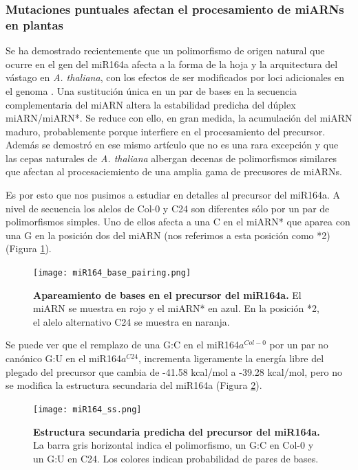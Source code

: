 \subsubsection{Mutaciones puntuales afectan el procesamiento de miARNs en plantas}

Se ha demostrado recientemente que un polimorfismo de origen natural que ocurre en el gen del miR164a afecta a la forma de la hoja y la arquitectura del vástago en \textit{A. thaliana}, con los efectos de ser modificados por loci adicionales en el genoma \citep{pmid22206705}.
Una sustitución única en un par de bases en la secuencia complementaria del miARN altera la estabilidad predicha del dúplex miARN/miARN*.
Se reduce con ello, en gran medida, la acumulación del miARN maduro, probablemente porque interfiere en el procesamiento del precursor.
Además se demostró en ese mismo artículo que no es una rara excepción y que las cepas naturales de \textit{A. thaliana} albergan decenas de polimorfismos similares que afectan al procesaciemiento de una amplia gama de precusores de miARNs.

Es por esto que nos pusimos a estudiar en detalles al precursor del miR164a.
A nivel de secuencia los alelos de Col-0 y C24 son diferentes sólo por un par de polimorfismos simples.
Uno de ellos afecta a una C en el miARN* que aparea con una G en la posición dos del miARN (nos referimos a esta posición como *2) (Figura \ref{fig:miR164_base_pairing}).

\begin{figure}[htbp!] 
	\centering    
	\texttt{[image: miR164\_base\_pairing.png]}
	\caption[Apareamiento de bases en el precursor del miR164a]{
		\textbf{Apareamiento de bases en el precursor del miR164a.}
		El miARN se muestra en rojo y el miARN* en azul.
		En la posición *2, el alelo alternativo C24 se muestra en naranja.
	}
	\label{fig:miR164_base_pairing}
\end{figure}

Se puede ver que el remplazo de una G:C en el miR164$a^{Col-0}$ por un par no canónico G:U en el miR164$a^{C24}$, incrementa ligeramente la energía libre del plegado del precursor que cambia de -41.58 kcal/mol a -39.28 kcal/mol, pero no se modifica la estructura secundaria del miR164a (Figura \ref{fig:miR164_ss}). 

\begin{figure}[htbp!] 
	\centering    
	\texttt{[image: miR164\_ss.png]}
	\caption[Estructura secundaria predicha del precursor del miR164a]{
	\textbf{Estructura secundaria predicha del precursor del miR164a.}
	La barra gris horizontal indica el polimorfismo, un G:C en Col-0 y un G:U en C24.
	Los colores indican probabilidad de pares de bases.
	}
	\label{fig:miR164_ss}
\end{figure}

